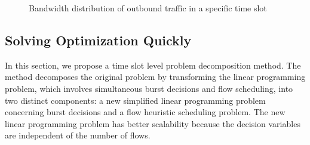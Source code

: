 
\begin{figure}
    \centering
    \label{fig:distriAllFlow}
    \quad
    \caption{\small Bandwidth distribution of outbound traffic in a specific time slot}
    \label{fig:distriPerfFlow}
    \label{fig:distriFlow}
\end{figure}


\subsection{Solving Optimization Quickly} \label{Solving Optimization Quickly}

In this section, we propose a time slot level problem decomposition method. The method decomposes the original problem by transforming the linear programming problem, which involves simultaneous {\egress}  burst decisions and flow scheduling, into two distinct components: a new simplified linear programming problem concerning {\egress} burst decisions and a flow heuristic scheduling problem. The new linear programming problem has better scalability because the decision variables are independent of the number of flows.

